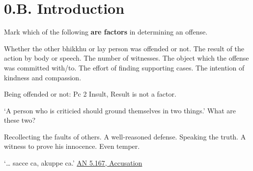 \chapter{0.B. Introduction}
\renewcommand*{\theChapterTitle}{B. Introduction}

\begin{exam}{\autoExamName}

\begin{problem}

  Mark which of the following \textbf{are factors} in determining an offense.

  \bigskip

  \begin{answers}{1}
    \bChoices
     Whether the other bhikkhu or lay person was offended or not. \eAns
     The result of the action by body or speech. \eAns
     The number of witnesses. \eAns
     The object which the offense was committed with/to. \eAns
     The effort of finding supporting cases. \eAns
     The intention of kindness and compassion. \eAns
    \eChoices
  \end{answers}

  \begin{solution}
    Being offended or not: Pc 2 Insult, Result is not a factor.
  \end{solution}

\end{problem}

\problemDivide

\begin{problem}

  `A person who is criticied should ground themselves in two things.' What are these two?

  \bigskip

  \begin{answers}{1}
    \bChoices
     Recollecting the faults of others. \eAns
     A well-reasoned defense. \eAns
     Speaking the truth. \eAns
     A witness to prove his innocence. \eAns
     Even temper. \eAns
    \eChoices
  \end{answers}

  \begin{solution}
    `\ldots{} sacce ca, akuppe ca.' \href{https://suttacentral.net/an5.167/en/sujato}{AN 5.167, Accusation}
  \end{solution}

\end{problem}


\end{exam}
